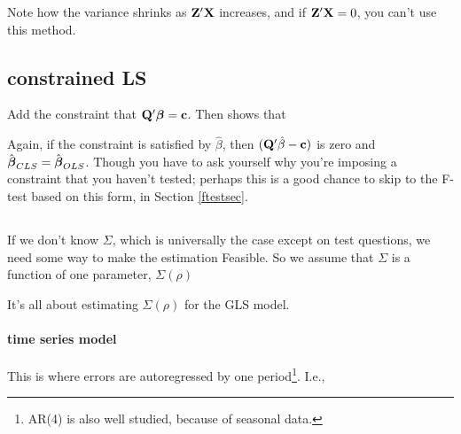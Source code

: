 
Note how the variance shrinks as ${\bf Z}'{\bf X}$ increases, and if
${\bf Z}'{\bf X}=0$, you can't use this method. 

\subsection{constrained LS }

Add the constraint that ${\bf Q}'{\mbox{\boldmath$\beta$}}={\bf c}$. Then \cite{amemiya:ez}
shows that 


Again, if the constraint is satisfied by $\hat\beta$, then
$({\bf Q}'\hat\beta-{\bf c})$ is zero and $\hat{{\mbox{\boldmath$\beta$}}}_{CLS}=\hat{{\mbox{\boldmath$\beta$}}}_{OLS}$.
Though you have to ask yourself why you're imposing a constraint that
you haven't tested; perhaps this is a good chance to skip to the F-test
based on this form, in Section \ref{ftestsec}.

\subsection{}

If we don't know $\Sigma$, which is universally the case except on
test questions, we need some way to make the estimation Feasible. So we
assume that $\Sigma$ is a function of one parameter, $\Sigma(\rho)$ 

\label{ts}

It's all about estimating $\Sigma(\rho)$ for the GLS model. 

\paragraph{ time series model}

This is where errors are autoregressed by one period\footnote{AR(4) is
also well studied, because of seasonal data.}. I.e.,

